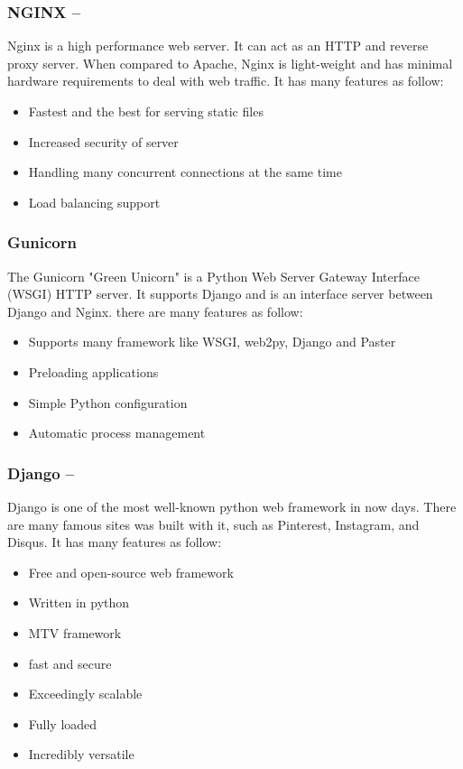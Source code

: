 \subsubsection*{NGINX  --  }

Nginx is a high performance web server. It can act as an HTTP and reverse proxy server. When compared to Apache, Nginx is light-weight and has minimal hardware requirements to deal with web traffic. It has many features as follow:
\begin{itemize}
	\item Fastest and the best for serving static files
	\item Increased security of server
	\item Handling many concurrent connections at the same time
	\item Load balancing support
\end{itemize}

\subsubsection*{Gunicorn}
The Gunicorn "Green Unicorn" is a Python Web Server Gateway Interface (WSGI) HTTP server. It supports Django and is an interface server between Django and Nginx.
there are many features as follow:
\begin{itemize}
	\item Supports many framework like WSGI, web2py, Django and Paster
	\item Preloading applications
	\item Simple Python configuration
	\item Automatic process management
\end{itemize}
\subsubsection*{Django  --  }
Django is one of the most well-known python web framework in now days. There are many famous sites was built with it, such as Pinterest, Instagram, and Disqus.
It has many features as follow:
\begin{itemize}
	\item Free and open-source web framework
	\item Written in python
	\item MTV framework
	\item fast and secure
	\item Exceedingly scalable
	\item Fully loaded
	\item Incredibly versatile
\end{itemize}

